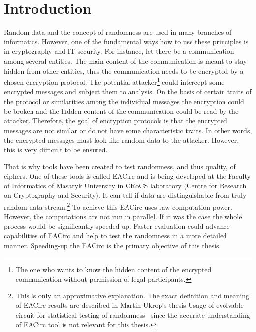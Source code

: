 \documentclass[12pt,twoside]{fithesis2}
\begin{document}
\chapter{Introduction}
Random data and the concept of randomness are used in many branches of informatics. However, one of the fundamental ways how to use these principles is in cryptography and IT security. For instance, let there be a communication among several entities. The main content of the communication is meant to stay hidden from other entities, thus the communication needs to be encrypted by a chosen encryption protocol. The potential attacker\footnote{The one who wants to know the hidden content of the encrypted communication without permission of legal participants.} could intercept some encrypted messages and subject them to analysis. On the basis of certain traits of the protocol or similarities among the individual messages the encryption could be broken and the hidden content of the communication could be read by the attacker. Therefore, the goal of encryption protocols is that the encrypted messages are not similar or do not have some characteristic traits. In other words, the encrypted messages must look like random data to the attacker. However, this is very difficult to be ensured.

That is why tools have been created to test randomness, and thus quality, of ciphers. One of these tools is called EACirc and is being developed at the Faculty of Informatics of Masaryk University in CRoCS laboratory (Centre for Research on Cryptography and Security). It can tell if data are distinguishable from truly random data stream.\footnote{This is only an approximative explanation. The exact definition and meaning of EACirc results are described in Martin Ukrop's thesis Usage of evolvable circuit for statistical testing of randomness~\cite{ukrop_thesis} since the accurate understanding of EACirc tool is not relevant for this thesis.} To achieve this EACirc uses raw computation power. However, the computations are not run in parallel. If it was the case the whole process would be significantly speeded-up. Faster evaluation could advance capabilities of EACirc and help to test the randomness in a more detailed manner. Speeding-up the EACirc is the primary objective of this thesis.
\end{document}
